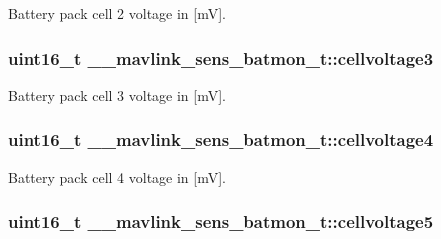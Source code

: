 Battery pack cell 2 voltage in \mbox{[}m\+V\mbox{]}. 

\hypertarget{struct____mavlink__sens__batmon__t_a85a90d69ef2495c0be4006c86ffaa218}{
\subsubsection[{cellvoltage3}]{\setlength{\rightskip}{0pt plus 5cm}uint16\+\_\+t \+\_\+\+\_\+mavlink\+\_\+sens\+\_\+batmon\+\_\+t\+::cellvoltage3}}\label{struct____mavlink__sens__batmon__t_a85a90d69ef2495c0be4006c86ffaa218}


Battery pack cell 3 voltage in \mbox{[}m\+V\mbox{]}. 

\hypertarget{struct____mavlink__sens__batmon__t_acb82f44139d405d9cdb1e2c7d8e627bc}{
\subsubsection[{cellvoltage4}]{\setlength{\rightskip}{0pt plus 5cm}uint16\+\_\+t \+\_\+\+\_\+mavlink\+\_\+sens\+\_\+batmon\+\_\+t\+::cellvoltage4}}\label{struct____mavlink__sens__batmon__t_acb82f44139d405d9cdb1e2c7d8e627bc}


Battery pack cell 4 voltage in \mbox{[}m\+V\mbox{]}. 

\hypertarget{struct____mavlink__sens__batmon__t_aa03d349529f6898565436e6ffa9e640f}{
\subsubsection[{cellvoltage5}]{\setlength{\rightskip}{0pt plus 5cm}uint16\+\_\+t \+\_\+\+\_\+mavlink\+\_\+sens\+\_\+batmon\+\_\+t\+::cellvoltage5}}\label{struct____mavlink__sens__batmon__t_aa03d349529f6898565436e6ffa9e640f}


